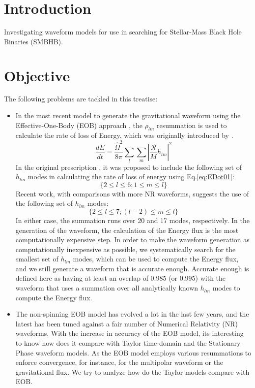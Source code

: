 \documentclass[aps,
prd,
amsmath,
amssymb,
twocolumn,
floatfix,
groupedaddress]{revtex4-1}
\begin{document}
\section{Introduction}\label{sec:level1:Introduction}
Investigating waveform models for use in searching for Stellar-Mass Black Hole Binaries (SMBHB).

\section{Objective}\label{sec:level1:Objective}
The following problems are tackled in this treatise:

\begin{itemize}
\item
In the most recent model to generate the gravitational waveform using the Effective-One-Body (EOB) approach \cite{BuonannoEOBv2Main}, the $\rho_{lm}$ resummation is used to calculate the rate of loss of Energy, which was originally introduced by \cite{DamourFluxhlm01}. 
\begin{equation}\label{eq:EDot01}
\frac{dE}{dt} = \frac{\hat{\Omega}^2}{8\pi} \displaystyle\sum\limits_{l}\displaystyle\sum\limits_{m} \left|\frac{\mathcal{R}}{M} h_{lm}\right|^2
\end{equation}
In the original prescription \cite{DamourFluxhlm01}, it was proposed to include the following set of $h_{lm}$ modes in calculating the rate of loss of energy using Eq.\eqref{eq:EDot01}: 
\begin{equation}
\{2\leq l\leq 6; 1\leq m \leq l\}
\end{equation}
Recent work\citep{BuonannoEOBv2Main}, with comparisons with more NR waveforms, suggests the use of the following set of $h_{lm}$ modes:
\begin{equation}
\{2\leq l \leq 7; (l-2)\leq m \leq l\}
\end{equation}
In either case, the summation runs over 20 and 17 modes, respectively. In the generation of the waveform, the calculation of the Energy flux is the most computationally expensive step. In order to make the waveform generation as computationally inexpensive as possible, we systematically search for the smallest set of $h_{lm}$ modes, which can be used to compute the Energy flux, and we still generate a waveform that is accurate enough. Accurate enough is defined here as having at least an overlap of 0.985 (or 0.995) with the waveform that uses a summation over all analytically known $h_{lm}$ modes to compute the Energy flux.
\item
The non-spinning EOB model has evolved a lot in the last few years, and the latest\citep{BuonannoEOBv2Main} has been tuned against a fair number of Numerical Relativity (NR) waveforms. With the increase in accuracy of the EOB model, its interesting to know how does it compare with Taylor time-domain and the Stationary Phase waveform models. As the EOB model employs various resummations to enforce convergence, for instance, for the multipolar waveform or the gravitational flux. We try to analyze how do the Taylor models compare with EOB. 

\end{itemize}
\end{document}
